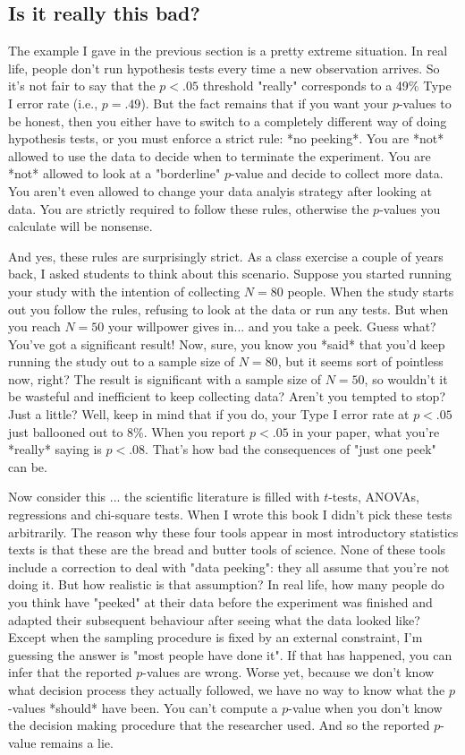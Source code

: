 \subsection{Is it really this bad?}

The example I gave in the previous section is a pretty extreme situation. In real life, people don't run hypothesis tests every time a new observation arrives. So it's not fair to say that the $p<.05$ threshold "really" corresponds to a 49\% Type I error rate (i.e., $p=.49$). But the fact remains that if you want your $p$-values to be honest, then you either have to switch to a completely different way of doing hypothesis tests, or you must enforce a strict rule: *no peeking*. You are *not* allowed to use the data to decide when to terminate the experiment. You are *not* allowed to look at a "borderline" $p$-value and decide to collect more data. You aren't even allowed to change your data analyis strategy after looking at data. You are strictly required to follow these rules, otherwise the $p$-values you calculate will be nonsense.

And yes, these rules are surprisingly strict. As a class exercise a couple of years back, I asked students to think about this scenario. Suppose you started running your study with the intention of collecting $N=80$ people. When the study starts out you follow the rules, refusing to look at the data or run any tests. But when you reach $N=50$ your willpower gives in... and you take a peek. Guess what? You've got a significant result! Now, sure, you know you *said* that you'd keep running the study out to a sample size of $N=80$, but it seems sort of pointless now, right? The result is significant with a sample size of $N=50$, so wouldn't it be wasteful and inefficient to keep collecting data? Aren't you tempted to stop? Just a little? Well, keep in mind that if you do, your Type I error rate at $p<.05$ just ballooned out to 8\%. When you report $p<.05$ in your paper, what you're *really* saying is $p<.08$. That's how bad the consequences of "just one peek" can be.

Now consider this ... the scientific literature is filled with $t$-tests, ANOVAs, regressions and chi-square tests. When I wrote this book I didn't pick these tests arbitrarily. The reason why these four tools appear in most introductory statistics texts is that these are the bread and butter tools of science. None of these tools include a correction to deal with "data peeking": they all assume that you're not doing it. But how realistic is that assumption? In real life, how many people do you think have "peeked" at their data before the experiment was finished and adapted their subsequent behaviour after seeing what the data looked like? Except when the sampling procedure is fixed by an external constraint, I'm guessing the answer is "most people have done it". If that has happened, you can infer that the reported $p$-values are wrong. Worse yet, because we don't know what decision process they actually followed, we have no way to know what the $p$-values *should* have been. You can't compute a $p$-value when you don't know the decision making procedure that the researcher used. And so the reported $p$-value remains a lie. 

